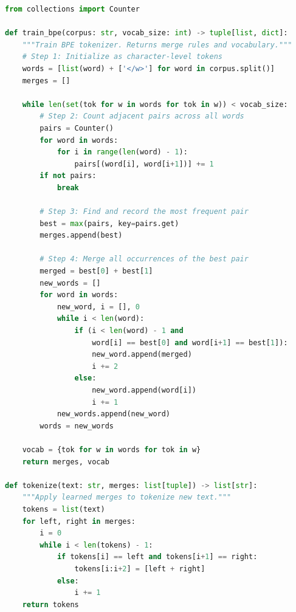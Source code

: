 \begin{lstlisting}[language=Python]
from collections import Counter

def train_bpe(corpus: str, vocab_size: int) -> tuple[list, dict]:
    """Train BPE tokenizer. Returns merge rules and vocabulary."""
    # Step 1: Initialize as character-level tokens
    words = [list(word) + ['</w>'] for word in corpus.split()]
    merges = []

    while len(set(tok for w in words for tok in w)) < vocab_size:
        # Step 2: Count adjacent pairs across all words
        pairs = Counter()
        for word in words:
            for i in range(len(word) - 1):
                pairs[(word[i], word[i+1])] += 1
        if not pairs:
            break

        # Step 3: Find and record the most frequent pair
        best = max(pairs, key=pairs.get)
        merges.append(best)

        # Step 4: Merge all occurrences of the best pair
        merged = best[0] + best[1]
        new_words = []
        for word in words:
            new_word, i = [], 0
            while i < len(word):
                if (i < len(word) - 1 and
                    word[i] == best[0] and word[i+1] == best[1]):
                    new_word.append(merged)
                    i += 2
                else:
                    new_word.append(word[i])
                    i += 1
            new_words.append(new_word)
        words = new_words

    vocab = {tok for w in words for tok in w}
    return merges, vocab

def tokenize(text: str, merges: list[tuple]) -> list[str]:
    """Apply learned merges to tokenize new text."""
    tokens = list(text)
    for left, right in merges:
        i = 0
        while i < len(tokens) - 1:
            if tokens[i] == left and tokens[i+1] == right:
                tokens[i:i+2] = [left + right]
            else:
                i += 1
    return tokens
\end{lstlisting}

